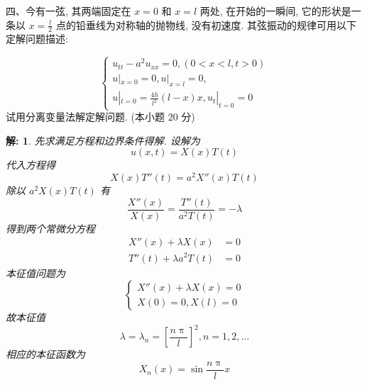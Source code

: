 \documentclass{article}
\theoremstyle{nonumberplain}
\newtheorem{solution}{\textcolor{gr}{解:}}
\begin{document}
    \begin{flushleft}
    	四、今有一弦, 其两端固定在 $x=0$ 和 $x=l$ 两处, 在开始的一瞬间, 它的形状是一条以 $x=\frac{l}{2}$ 点的铅垂线为对称轴的抛物线, 没有初速度. 其弦振动的规律可用以下定解问题描述:
    \end{flushleft}
    \begin{equation*}
    \begin{cases}
    u_{tt}-a^2 u_{xx}=0,(0<x<l,t>0)\\
    u|_{x=0}=0,u|_{x=l}=0,\\
    u|_{t=0}=\frac{4h}{l^2}(l-x)x,u_{t}|_{t=0}=0
    \end{cases}
    \end{equation*}
    试用分离变量法解定解问题. (本小题 $20$ 分)
    \begin{solution}
    	先求满足方程和边界条件得解. 设解为
    		\begin{equation*}
    			u(x,t)=X(x)T(t)\tag*{$\cdots\cdots2$分}
    		\end{equation*}
        代入方程得
        \begin{equation*}
        	X(x)T''(t)=a^2 X''(x)T(t)
        \end{equation*}
        除以 $a^2 X(x)T(t)$ 有
        	\begin{equation*}
        		\frac{X''(x)}{X(x)}=\frac{T''(t)}{a^2 T(t)}=-\lambda\tag*{$\cdots\cdots2$分}
        	\end{equation*}
        得到两个常微分方程
        	\begin{align*}
        		X''(x)+\lambda X(x)&=0\\
        		T''(t)+\lambda a^2 T(t)&=0\tag*{$\cdots\cdots2$分}
        	\end{align*}
        本征值问题为
        \begin{equation*}
        	\begin{cases}
        	X''(x)+\lambda X(x)=0\\
        	X(0)=0,X(l)=0
        	\end{cases}
        \end{equation*}
        故本征值
        \begin{equation*}
        	\lambda=\lambda_{n}=\left[ \frac{n\uppi}{l} \right]^2,n=1,2,\ldots\tag*{$\cdots\cdots2$分}
        \end{equation*}
        相应的本征函数为
        \begin{equation*}
        	X_{n}(x)=\sin\frac{n\uppi}{l}x\tag*{$\cdots\cdots2$分}
        \end{equation*}

\end{solution}
\end{document}
